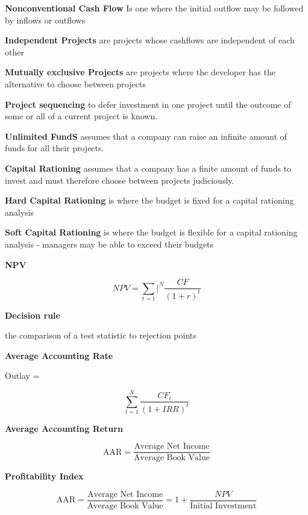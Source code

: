 \documentclass[12pt]{article}
\begin{document}
	
		\textbf{Nonconventional Cash Flow} Is one where the initial outflow may be followed by inflows or outflows
		
			\textbf{Independent Projects} are projects whose cashflows are independent of each other
			
				\textbf{Mutually exclusive Projects} are projects where the developer has the alternative to choose between projects
				 
					\textbf{Project sequencing} to defer investment in one project until the outcome of some or all of a current project is known.
					
						\textbf{Unlimited FundS} assumes that a company can raise an infinite amount of funds for all their projects.
						
							\textbf{Capital Rationing} assumes that a company has a finite amount of funds to invest and must therefore choose between projects judiciously.
							 
							 \textbf{Hard Capital Rationing} is where the budget is fixed for a capital rationing analysis
							 
							 \textbf{Soft Capital Rationing} is where the budget is flexible for a capital rationing analysis - managers may be able to exceed their budgets
							 
							 	\textbf{NPV}
							 	
							 	$$
							 	NPV = \sum_{t=1}|^N \dfrac{CF}{(1 + r)^t}
							 	$$
							 	
							 		\textbf{Decision rule}
							 		
							 		the comparison of a test statistic to rejection points
							 		
							 			\textbf{Average Accounting Rate}
							 			
							 			Outlay = 
							 			
							 			$$
							 			\sum_{t=1}^N \dfrac{CF_t}{(1 + IRR)^t}
							 			$$
							 			
							 			\textbf{Average Accounting Return}
							 			
							 			$$
							 			\text{AAR} = \dfrac{\text{Average Net Income}}{\text{Average Book Value}}
							 			$$
							 			
							 			\textbf{Profitability Index}
							 			
							 			$$
							 			\text{AAR} = \dfrac{\text{Average Net Income}}{\text{Average Book Value}} = 1 + \dfrac{NPV}{\text{Initial Investment}}
							 			$$
							 			
\end{document}
